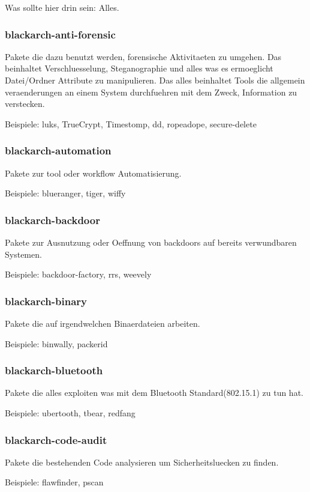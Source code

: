 \documentclass[a4paper, oneside, 11pt]{book}
\begin{document}
Was sollte hier drin sein: Alles.

\subsubsection{blackarch-anti-forensic}
Pakete die dazu benutzt werden, forensische Aktivitaeten zu umgehen. Das beinhaltet Verschluesselung, Steganographie 
und alles was es ermoeglicht Datei/Ordner Attribute zu manipulieren.
Das alles beinhaltet Tools die allgemein veraenderungen an einem System durchfuehren mit dem Zweck,
Information zu verstecken. 

Beispiele: luks, TrueCrypt, Timestomp, dd, ropeadope, secure-delete

\subsubsection{blackarch-automation}
Pakete zur tool oder workflow Automatisierung.

Beispiele: blueranger, tiger, wiffy

\subsubsection{blackarch-backdoor}
Pakete zur Ausnutzung oder Oeffnung von backdoors auf bereits verwundbaren
Systemen.

Beispiele: backdoor-factory, rrs, weevely

\subsubsection{blackarch-binary}
Pakete die auf irgendwelchen Binaerdateien arbeiten.

Beispiele: binwally, packerid

\subsubsection{blackarch-bluetooth}
Pakete die alles exploiten was mit dem Bluetooth Standard(802.15.1) zu tun hat.

Beispiele: ubertooth, tbear, redfang

\subsubsection{blackarch-code-audit}
Pakete die bestehenden Code analysieren um Sicherheitsluecken zu finden.

Beispiele: flawfinder, pscan
\end{document}
